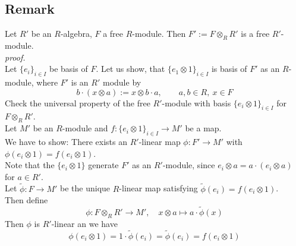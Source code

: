 \documentclass[12pt]{book}
\begin{document}
\begin{spacing}{1.3}
\subsection{Remark} %
Let $R'$ be an $R$-algebra, $F$ a free $R$-module. Then $F':= F \otimes_R R'$ is a free $R'$-module.\\
\textit{proof.}\\
Let $\{e_i\}_{i\in I}$ be basis of $F$. Let us show, that $\{e_1 \otimes 1\}_{i\in I}$ is basis of $F'$ as an $R$-module, where $F'$ is an $R'$ module by 
$$b \cdot (x \otimes a) := x \otimes b \cdot a, \qquad a,b \in R, \ x \in F$$
Check the universal property of the free $R'$-module with basis $\{e_i \otimes 1\}_{i \in I}$ for $F \otimes_R R'$.\\
Let $M'$ be an $R$-module and $f: \{e_i \otimes 1 \}_{i \in I} \longrightarrow M'$ be a map. \\
We have to show: There exists an $R'$-linear map $\phi: F' \longrightarrow M'$ with $\phi(e_i \otimes 1 ) = f (e_i \otimes 1)$.\\
Note that the $\{e_i \otimes 1 \}$ generate $F'$ as an $R'$-module, since $e_i \otimes a =a \cdot (e_i \otimes a )$ for $a \in R'$.\\
Let $\tilde{\phi}: F \longrightarrow M'$ be the unique $R$-linear map satisfying $\tilde{\phi}(e_i)= f(e_i\otimes 1)$.\\ Then define 
$$\phi: F \otimes_R R' \longrightarrow M', \quad x \otimes a \mapsto a \cdot \tilde{\phi}(x)$$
Then $\phi$ is $R'$-linear an we have 
$$\phi(e_i \otimes 1)= 1 \cdot \tilde{\phi}(e_i)= \tilde{\phi}(e_i)=f(e_i \otimes 1)$$


\end{spacing}
\end{document}
